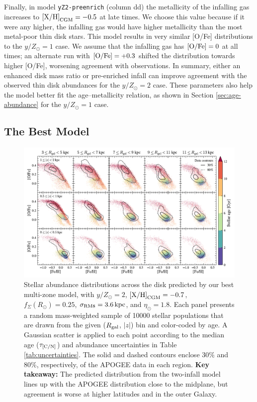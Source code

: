 \documentclass[twocolumn,twocolappendix,linenumbers]{aastex631}
\newcommand{\mathXH}{{\rm [X/H]}}
\newcommand{\mathOFe}{{\rm [O/Fe]}}
\newcommand{\yZ}[1]{$y/Z_\odot=#1$}
\newcommand{\kpc}{\,{\rm kpc}}
\begin{document}
Finally, in model {\tt yZ2-preenrich} (column dd) the metallicity of the infalling gas increases to $\mathXH_{\rm CGM}=-0.5$ at late times. We choose this value because if it were any higher, the infalling gas would have higher metallicity than the most metal-poor thin disk stars. This model results in very similar [O/Fe] distributions to the $y/Z_\odot=1$ case. We assume that the infalling gas has $\mathOFe=0$ at all times; an alternate run with $\mathOFe=+0.3$ shifted the distribution towards higher [O/Fe], worsening agreement with observations. In summary, either an enhanced disk mass ratio or pre-enriched infall can improve agreement with the observed thin disk abundances for the \yZ{2} case. These parameters also help the model better fit the age--metallicity relation, as shown in Section \ref{sec:age-abundance} for the \yZ{1} case.

\subsection{The Best Model}
\label{sec:ofe-feh-best}

\begin{figure}
    \centering
    \includegraphics[width=\linewidth]{figures/ofe_feh_best.pdf}
    \caption{Stellar abundance distributions across the disk predicted by our best multi-zone model, with \yZ{2}, ${\rm [X/H]}_{\rm CGM}=-0.7$, $f_\Sigma(R_\odot)=0.25$, $\sigma_{\rm RM8}=3.6\kpc$, and $\eta_\odot=1.8$. Each panel presents a random mass-weighted sample of \num{10000} stellar populations that are drawn from the given ($R_{\rm gal}$, $|z|$) bin and color-coded by age. A Gaussian scatter is applied to each point according to the median age ($\tau_{\rm [C/N]}$) and abundance uncertainties in Table \ref{tab:uncertainties}. The solid and dashed contours enclose 30\% and 80\%, respectively, of the APOGEE data in each region. {\bf Key takeaway:} The predicted distribution from the two-infall model lines up with the APOGEE distribution close to the midplane, but agreement is worse at higher latitudes and in the outer Galaxy.}
    \label{fig:ofe-feh-best}
\end{figure}
\end{document}
